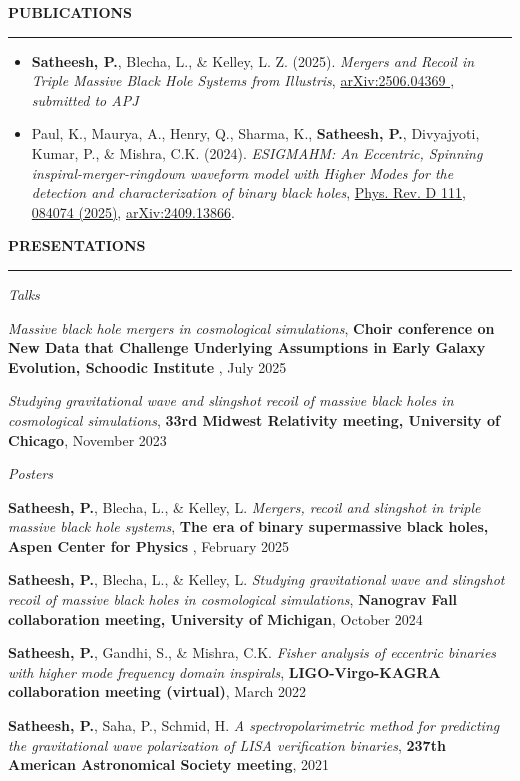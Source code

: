 \documentclass{resume} %
\renewenvironment{rSection}[1]{
\sectionskip
\textbf{\textcolor{C2}{\MakeUppercase{#1}}}
\sectionlineskip
\hrule
\begin{list}{}{
\setlength{\leftmargin}{1.5em}
}
\item[]
}{
\end{list}
}
\newcommand{\conference}[1]{\textcolor{C2}{\textbf{#1}}}
\begin{document}
\begin{rSection}{Publications}
\begin{itemize}
    \item \textbf{Satheesh, P.}, Blecha, L., \& Kelley, L. Z. (2025). \emph{Mergers and Recoil in Triple Massive Black Hole Systems from Illustris}, \href{https://arxiv.org/abs/2506.04369}{arXiv:2506.04369
}, \emph{submitted to APJ}
    \item Paul, K., Maurya, A., Henry, Q., Sharma, K., \textbf{Satheesh, P.}, Divyajyoti, Kumar, P., \& Mishra, C.K. (2024). \emph{ESIGMAHM: An Eccentric, Spinning inspiral-merger-ringdown waveform model with Higher Modes for the detection and characterization of binary black holes}, \href{https://journals.aps.org/prd/abstract/10.1103/PhysRevD.111.084074}{Phys. Rev. D 111, 084074 (2025)}, \href{https://arxiv.org/abs/2409.13866}{arXiv:2409.13866}.
\end{itemize}

\end{rSection}

\begin{rSection}{Presentations}
    \begin{rSubsection}{\textit{Talks}}{}{}{}
        \item \emph{Massive black hole mergers in cosmological simulations}, \conference{Choir conference on New Data that Challenge Underlying Assumptions in Early Galaxy Evolution, Schoodic Institute }, July 2025
        \item \emph{Studying gravitational wave and slingshot recoil of massive black holes in cosmological simulations}, \conference{33rd Midwest Relativity meeting, University of Chicago}, November 2023 
    \end{rSubsection}
    \begin{rSubsection}{\textit{Posters}}{}{}{}
        \item \textbf{Satheesh, P.}, Blecha, L., \& Kelley, L. \emph{Mergers, recoil and slingshot in triple massive black hole systems}, \conference{The era of binary supermassive black holes, Aspen Center for Physics} , February 2025
        \item \textbf{Satheesh, P.}, Blecha, L., \& Kelley, L. \emph{Studying gravitational wave and slingshot recoil of massive black holes in cosmological simulations}, \conference{Nanograv Fall collaboration meeting, University of Michigan}, October 2024
        \item \textbf{Satheesh, P.}, Gandhi, S., \& Mishra, C.K. \emph{Fisher analysis of eccentric binaries with higher mode frequency domain inspirals}, \conference{LIGO-Virgo-KAGRA collaboration meeting (virtual)},  March 2022 
        \item \textbf{Satheesh, P.}, Saha, P., Schmid, H. \emph{A spectropolarimetric method for predicting the gravitational wave polarization of LISA verification binaries}, \conference{237th American Astronomical Society meeting}, 2021
    \end{rSubsection}
\end{rSection}
\end{document}

